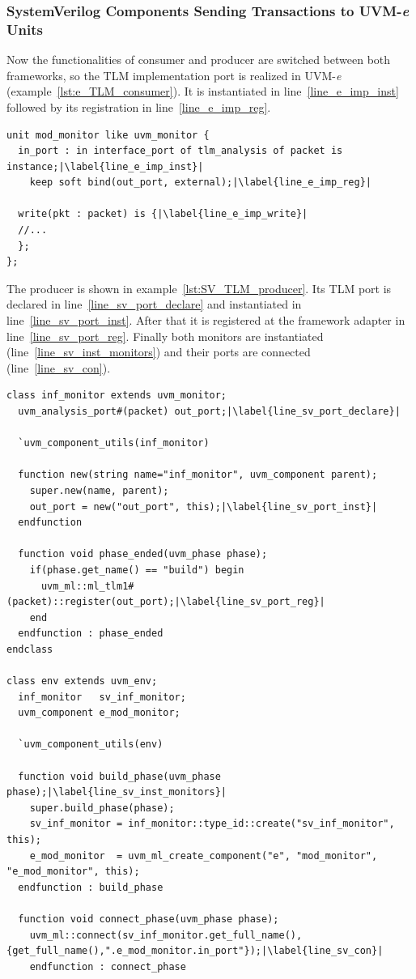\subsubsection{SystemVerilog Components Sending Transactions to UVM-\textit{e} Units}
Now the functionalities of consumer and producer are switched between both frameworks, so the TLM implementation port is
realized in UVM-\textit{e} (example~\ref{lst:e_TLM_consumer}). It is instantiated in line~\ref{line_e_imp_inst} followed
by its registration in line~\ref{line_e_imp_reg}.
\lstset{language=e, numbers = left, escapechar=|, breaklines=true}
\begin{lstlisting}[frame=htrbl, caption={\textit{e}: consumer side of a TLM connection},
label={lst:e_TLM_consumer}]
unit mod_monitor like uvm_monitor {
  in_port : in interface_port of tlm_analysis of packet is instance;|\label{line_e_imp_inst}|
    keep soft bind(out_port, external);|\label{line_e_imp_reg}|
    
  write(pkt : packet) is {|\label{line_e_imp_write}|
  //...
  };
};
\end{lstlisting}
The producer is shown in example~\ref{lst:SV_TLM_producer}. Its TLM port is declared in line~\ref{line_sv_port_declare}
and instantiated in line~\ref{line_sv_port_inst}. After that it is registered at the framework adapter in
line~\ref{line_sv_port_reg}. Finally both monitors are instantiated (line~\ref{line_sv_inst_monitors}) and their ports are connected (line~\ref{line_sv_con}).
\lstset{language=SystemVerilog, numbers = left, escapechar=|, breaklines=true}
\begin{lstlisting}[frame=htrbl, caption={SystemVerilog: producer side of a TLM connection},
label={lst:SV_TLM_producer}]
class inf_monitor extends uvm_monitor;
  uvm_analysis_port#(packet) out_port;|\label{line_sv_port_declare}|
  
  `uvm_component_utils(inf_monitor)
  
  function new(string name="inf_monitor", uvm_component parent);
    super.new(name, parent);
    out_port = new("out_port", this);|\label{line_sv_port_inst}|
  endfunction 
  
  function void phase_ended(uvm_phase phase);
    if(phase.get_name() == "build") begin
      uvm_ml::ml_tlm1#(packet)::register(out_port);|\label{line_sv_port_reg}|
    end
  endfunction : phase_ended
endclass

class env extends uvm_env;
  inf_monitor   sv_inf_monitor;
  uvm_component e_mod_monitor;
  
  `uvm_component_utils(env)
  
  function void build_phase(uvm_phase phase);|\label{line_sv_inst_monitors}|
    super.build_phase(phase);
    sv_inf_monitor = inf_monitor::type_id::create("sv_inf_monitor", this);
    e_mod_monitor  = uvm_ml_create_component("e", "mod_monitor", "e_mod_monitor", this); 
  endfunction : build_phase
  
  function void connect_phase(uvm_phase phase);
    uvm_ml::connect(sv_inf_monitor.get_full_name(), {get_full_name(),".e_mod_monitor.in_port"});|\label{line_sv_con}|
    endfunction : connect_phase
\end{lstlisting}

